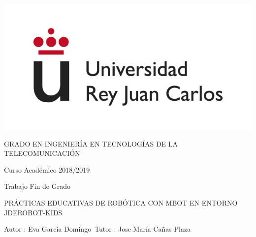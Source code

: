 \documentclass[a4paper, 12pt]{book}
\begin{document}
	\begin{titlepage}
		\centering
		\includegraphics[scale=0.5]{img/logo_urjc.jpg}
		\vspace{3cm}
		
		\Large
		GRADO EN INGENIERÍA EN TECNOLOGÍAS DE LA TELECOMUNICACIÓN
		
		\vspace{0.4cm}
		
		\large
		Curso Académico 2018/2019
		
		\vspace{0.8cm}
		
		Trabajo Fin de Grado
		
		\vspace{2.5cm}		
		\LARGE		
		PRÁCTICAS EDUCATIVAS DE ROBÓTICA CON MBOT EN ENTORNO JDEROBOT-KIDS
		
		\vspace{2.5 cm}
		
		\large
		Autor : Eva García Domingo\
		Tutor : Jose María Cañas Plaza
		\afterpage{\null\newpage}
		\pagestyle{empty}
	\end{titlepage}
	
	
	
	
	
	\tableofcontents
	\setcounter{page}{1}
	\mainmatter

	
%	
%	
%	
%	
%	

	
	
	
\end{document}
